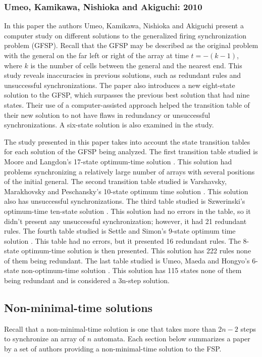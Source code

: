 \documentclass{article}
\begin{document}
\subsubsection{Umeo, Kamikawa, Nishioka and Akiguchi: 2010}

\indent In this paper the authors Umeo, Kamikawa, Nishioka and Akiguchi \cite{umeo2010generalized} present a computer study on different solutions to the generalized firing synchronization problem (GFSP). Recall that the GFSP may be described as the original problem with the general on the far left or right of the array at time $t = -(k - 1)$, where $k$ is the number of cells between the general and the nearest end. This study reveals inaccuracies in previous solutions, such as redundant rules and unsuccessful synchronizations. The paper also introduces a new eight-state solution to the GFSP, which surpasses the previous best solution that had nine states. Their use of a computer-assisted approach helped the transition table of their new solution to not have flaws in redundancy or unsuccessful synchronizations. A six-state solution is also examined in the study.

The study presented in this paper takes into account the state transition tables for each solution of the GFSP being analyzed. The first transition table studied is Moore and Langdon's 17-state optimum-time solution \cite{MooreLangdon1968}. This solution had problems synchronizing a relatively large number of arrays with several positions of the initial general. The second transition table studied is Varshavsky, Marakhovsky and Peschansky's 10-state optimum time solution \cite{VMP1970}. This solution also has unsuccessful synchronizations. The third table studied is Szwerinski's optimum-time ten-state solution \cite{szwerinski1982time}. This solution had no errors in the table, so it didn't present any unsuccessful synchronization; however, it had 21 redundant rules.  The fourth table studied is Settle and Simon's 9-state optimum time solution \cite{settle2002smaller}. This table had no errors, but it presented 16 redundant rules. The 8-state optimum-time solution is then presented. This solution has 222 rules none of them being redundant. The last table studied is Umeo, Maeda and Hongyo's 6-state non-optimum-time solution \cite{umeo2006design}. This solution has 115 states none of them being redundant and is considered a 3n-step solution.

\subsection{Non-minimal-time solutions}
Recall that a non-minimal-time solution is one that takes more than $2n-2$ steps to synchronize an array of $n$ automata. Each section below summarizes a paper by a set of authors providing a non-minimal-time solution to the FSP.
\end{document}
